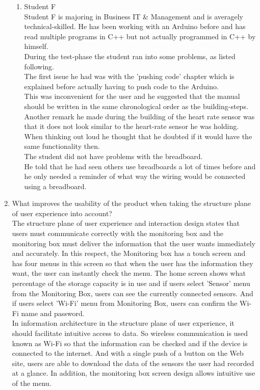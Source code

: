\documentclass[conference]{IEEEtran}
\begin{document}
\begin{enumerate}
\begin{enumerate}
					\item Student F\\
					Student F is majoring in Business IT \& Management and is averagely technical-skilled. He has been working with an Arduino before and has read multiple programs in C++ but not actually programmed in C++ by himself.\\
					During the test-phase the student ran into some problems, as listed following.\\
					The first issue he had was with the 'pushing code' chapter which is explained before actually having to push code to the Arduino.\\ 
					This was inconvenient for the user and he suggested that the manual should be written in the same chronological order as the building-steps.\\
					Another remark he made during the building of the heart rate sensor was that it does not look similar to the heart-rate sensor he was holding. \\
When thinking out loud he thought that he doubted if it would have the same functionality then.\\
The student did not have problems with the breadboard.\\
He told that he had seen others use breadboards a lot of times before and he only needed a reminder of what way the wiring would be connected using a breadboard.
				\end{enumerate}
				\newpage

			\item What improves the usability of the product when taking the structure plane of user experience into account?\\

				The structure plane of user experience and interaction design states that users must communicate correctly with the monitoring box and the monitoring box must deliver the information that the user wants immediately and accurately. In this respect, the Monitoring box has a touch screen and has four menus in this screen so that when the user has the information they want, the user can instantly check the menu. The home screen shows what percentage of the storage capacity is in use and if users select 'Sensor' menu from the Monitoring Box, users can see the currently connected sensors. And if users select 'Wi-Fi' menu from Monitoring Box, users can confirm the Wi-Fi name and password.\\
				In information architecture in the structure plane of user experience, it should facilitate intuitive access to data. So wireless communication is used known as Wi-Fi so that the information can be checked and if the device is connected to the internet. And with a single push of a button on the Web site, users are able to download the data of the sensors the user had recorded at a glance. In addition, the monitoring box screen design allows intuitive use of the menu.
\\


\end{enumerate}
\end{document}
